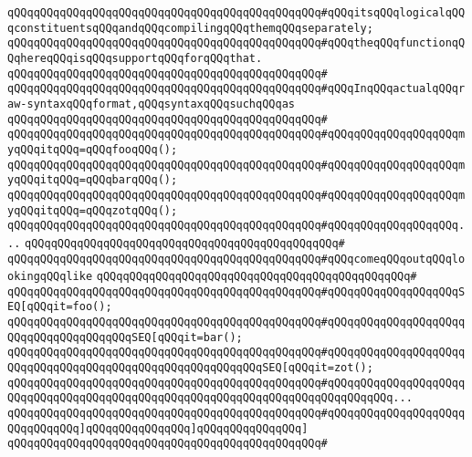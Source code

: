 \verb|qQQqqQQqqQQqqQQqqQQqqQQqqQQqqQQqqQQqqQQqqQQqqQQq#qQQqitsqQQqlogicalqQQqconstituentsqQQqandqQQqcompilingqQQqthemqQQqseparately;|\newline
\verb|qQQqqQQqqQQqqQQqqQQqqQQqqQQqqQQqqQQqqQQqqQQqqQQq#qQQqtheqQQqfunctionqQQqhereqQQqisqQQqsupportqQQqforqQQqthat.|\newline
\verb|qQQqqQQqqQQqqQQqqQQqqQQqqQQqqQQqqQQqqQQqqQQqqQQq#|\newline
\verb|qQQqqQQqqQQqqQQqqQQqqQQqqQQqqQQqqQQqqQQqqQQqqQQq#qQQqInqQQqactualqQQqraw-syntaxqQQqformat,qQQqsyntaxqQQqsuchqQQqas|\newline
\verb|qQQqqQQqqQQqqQQqqQQqqQQqqQQqqQQqqQQqqQQqqQQqqQQq#|\newline
\verb|qQQqqQQqqQQqqQQqqQQqqQQqqQQqqQQqqQQqqQQqqQQqqQQq#qQQqqQQqqQQqqQQqqQQqmyqQQqitqQQq=qQQqfooqQQq();|\newline
\verb|qQQqqQQqqQQqqQQqqQQqqQQqqQQqqQQqqQQqqQQqqQQqqQQq#qQQqqQQqqQQqqQQqqQQqmyqQQqitqQQq=qQQqbarqQQq();|\newline
\verb|qQQqqQQqqQQqqQQqqQQqqQQqqQQqqQQqqQQqqQQqqQQqqQQq#qQQqqQQqqQQqqQQqqQQqmyqQQqitqQQq=qQQqzotqQQq();|\newline
\verb|qQQqqQQqqQQqqQQqqQQqqQQqqQQqqQQqqQQqqQQqqQQqqQQq#qQQqqQQqqQQqqQQqqQQq...|\newline
\verb|qQQqqQQqqQQqqQQqqQQqqQQqqQQqqQQqqQQqqQQqqQQqqQQq#|\newline
\verb|qQQqqQQqqQQqqQQqqQQqqQQqqQQqqQQqqQQqqQQqqQQqqQQq#qQQqcomeqQQqoutqQQqlookingqQQqlike|\newline
\verb|qQQqqQQqqQQqqQQqqQQqqQQqqQQqqQQqqQQqqQQqqQQqqQQq#|\newline
\verb|qQQqqQQqqQQqqQQqqQQqqQQqqQQqqQQqqQQqqQQqqQQqqQQq#qQQqqQQqqQQqqQQqqQQqSEQ[qQQqit=foo();|\newline
\verb|qQQqqQQqqQQqqQQqqQQqqQQqqQQqqQQqqQQqqQQqqQQqqQQq#qQQqqQQqqQQqqQQqqQQqqQQqqQQqqQQqqQQqqQQqSEQ[qQQqit=bar();|\newline
\verb|qQQqqQQqqQQqqQQqqQQqqQQqqQQqqQQqqQQqqQQqqQQqqQQq#qQQqqQQqqQQqqQQqqQQqqQQqqQQqqQQqqQQqqQQqqQQqqQQqqQQqqQQqqQQqSEQ[qQQqit=zot();|\newline
\verb|qQQqqQQqqQQqqQQqqQQqqQQqqQQqqQQqqQQqqQQqqQQqqQQq#qQQqqQQqqQQqqQQqqQQqqQQqqQQqqQQqqQQqqQQqqQQqqQQqqQQqqQQqqQQqqQQqqQQqqQQqqQQqqQQq...|\newline
\verb|qQQqqQQqqQQqqQQqqQQqqQQqqQQqqQQqqQQqqQQqqQQqqQQq#qQQqqQQqqQQqqQQqqQQqqQQqqQQqqQQq]qQQqqQQqqQQqqQQq]qQQqqQQqqQQqqQQq]|\newline
\verb|qQQqqQQqqQQqqQQqqQQqqQQqqQQqqQQqqQQqqQQqqQQqqQQq#|\newline
